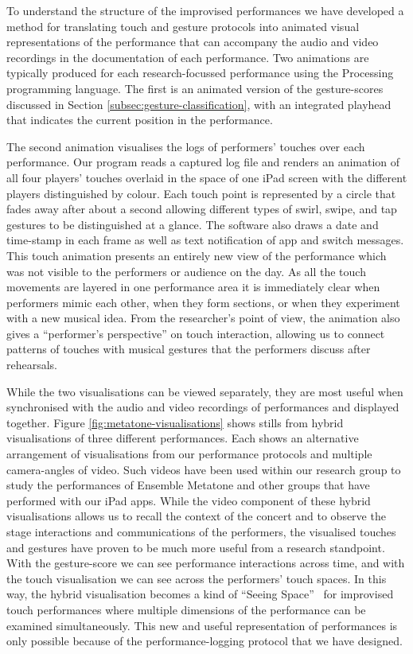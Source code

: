 \documentclass[graybox]{svmult}
\begin{document}
To understand the structure of the improvised performances we have
developed a method for translating touch and gesture protocols into
animated visual representations of the performance that can accompany
the audio and video recordings in the documentation of each
performance. Two animations are typically produced for each
research-focussed performance using the 
Processing~\cite{Reas:2006kq} programming language.
The first is an animated version of the gesture-scores
discussed in Section \ref{subsec:gesture-classification}, with an
integrated playhead that indicates the current position in the
performance. 

The second animation visualises the logs of performers'
touches over each performance. Our program reads a captured log file
and renders an animation of all four players' touches overlaid in the
space of one iPad screen with the different players distinguished by
colour. Each touch point is represented by a circle that fades away
after about a second allowing different types of swirl, swipe, and tap
gestures to be distinguished at a glance. The software also draws a
date and time-stamp in each frame as well as text notification of app
and switch messages.
This touch animation presents an entirely new view of the
performance which was not visible to the performers or audience on the
day. As all the touch movements are layered in one performance area it
is immediately clear when performers mimic each other, when they form sections,
or when they experiment with a new musical idea. From the researcher's point of
view, the animation also gives a ``performer's perspective'' on touch
interaction, allowing us to connect patterns of touches with musical
gestures that the performers discuss after rehearsals.

While the two visualisations can be viewed separately, they are most
useful when synchronised with the audio and video recordings of
performances and displayed together. Figure
\ref{fig:metatone-visualisations} shows stills from hybrid
visualisations of three different performances. Each shows an
alternative arrangement of visualisations from our performance
protocols and multiple camera-angles of video. Such videos have been
used within our research group to study the performances of Ensemble
Metatone and other groups that have performed with our iPad apps.
While the video component of these hybrid visualisations allows us to
recall the context of the concert and to observe the stage
interactions and communications of the performers, the visualised
touches and gestures have proven to be much more useful from a
research standpoint. With the gesture-score we can see performance
interactions across time, and with the touch visualisation we can see
across the performers' touch spaces. In this way, the hybrid
visualisation becomes a kind of ``Seeing Space''~\cite{Victor:2014sf}
for improvised touch performances where multiple dimensions of the
performance can be examined simultaneously. This new and useful
representation of performances is only possible because of the
performance-logging protocol that we have designed.
\end{document}
